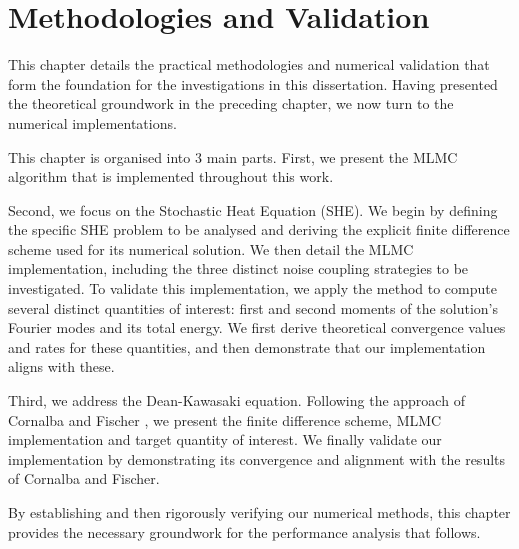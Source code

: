 \chapter{Methodologies and Validation}\label{chap:method_and_validation}

This chapter details the practical methodologies and numerical validation 
that form the foundation for the investigations in this dissertation. Having 
presented the theoretical groundwork in the preceding chapter, we now 
turn to the numerical implementations.

This chapter is organised into 3 main parts. First, 
we present the MLMC algorithm that is implemented throughout this work.


Second, we focus on the Stochastic Heat Equation (SHE). We begin
by defining the specific SHE problem to be analysed and 
deriving the explicit finite difference scheme 
used for its numerical solution. We then 
detail the MLMC implementation,
including the three distinct noise coupling strategies to be investigated. 
To validate this implementation, we apply the method to compute several 
distinct quantities of interest: first and second moments of the solution's
Fourier modes and its total energy. We first derive 
theoretical convergence values and rates for these quantities, and then demonstrate that
our implementation aligns with these.

Third, we address the Dean-Kawasaki equation. Following 
the approach of Cornalba and Fischer \cite{cornalba2025multilevel}, 
we present the finite difference scheme, MLMC implementation and target 
quantity of interest. 
We finally validate our implementation
by demonstrating its convergence and alignment with the results of Cornalba and Fischer.

By establishing and then rigorously verifying our numerical methods, this chapter 
provides the necessary groundwork for the performance analysis that follows. 



